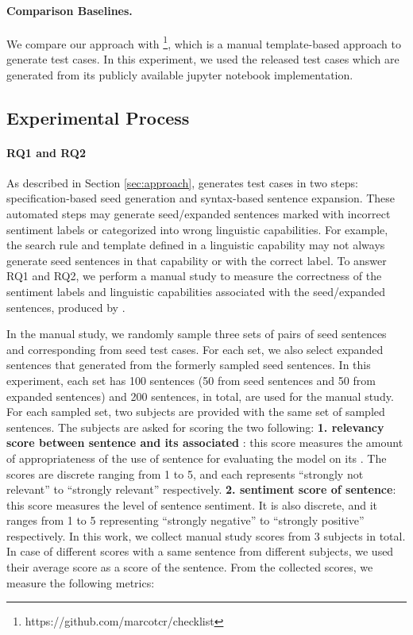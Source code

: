 \paragraph{\textbf{Comparison Baselines.}}
We compare our approach with
\Cklst\footnote{https://github.com/marcotcr/checklist}, which is a
manual template-based approach to generate test cases. In this
experiment, we used the \Cklst released \sa test cases which are
generated from its publicly available jupyter notebook implementation.


\subsection{Experimental Process}

\paragraph{\textbf{RQ1 and RQ2}} As described in Section \ref{sec:approach},
\tool generates test cases in two steps: specification-based seed
generation and syntax-based sentence expansion. These automated steps
may generate seed/expanded sentences marked with incorrect sentiment
labels or categorized into wrong linguistic capabilities. For example,
the search rule and template defined in a linguistic capability may
not always generate seed sentences in that capability or with the
correct label.  To answer RQ1 and RQ2, we perform a manual study to
measure the correctness of the sentiment labels and linguistic
capabilities associated with the seed/expanded sentences, produced by
\tool.

In the manual study, we randomly sample three sets of pairs of seed
sentences and corresponding \lc from seed test cases. For each set, we
also select expanded sentences that \tool generated from the formerly
sampled seed sentences. In this experiment, each set has 100 sentences
(50 from seed sentences and 50 from expanded sentences) and 200
sentences, in total, are used for the manual study. For each sampled
set, two subjects are provided with the same set of sampled
sentences. The subjects are asked for scoring the two following:
\textbf{1. relevancy score between sentence and its associated \lc}:
this score measures the amount of appropriateness of the use of
sentence for evaluating the model on its \lc.  The scores are discrete
ranging from 1 to 5, and each represents ``strongly not relevant'' to
``strongly relevant'' respectively. \textbf{2. sentiment score of
  sentence}: this score measures the level of sentence sentiment. It
is also discrete, and it ranges from 1 to 5 representing ``strongly
negative'' to ``strongly positive'' respectively. In this work, we
collect manual study scores from 3 subjects in total. In case of
different scores with a same sentence from different subjects, we used
their average score as a score of the sentence.
From the collected scores, we measure the following metrics:

